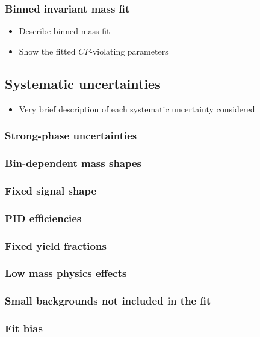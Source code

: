 \documentclass[12pt, a4paper, notitlepage, onecolumn]{article}
\begin{document}
\subsubsection{Binned invariant mass fit}
  \begin{itemize}[nosep]
    \setlength{\itemindent}{2.5em}
    \item[\textasteriskcentered]{Describe binned mass fit}
    \item[\textasteriskcentered]{Show the fitted $C\!P$-violating parameters}
  \end{itemize}
\subsection{Systematic uncertainties}
  \begin{itemize}[nosep]
    \setlength{\itemindent}{2em}
    \item[\textendash]{Very brief description of each systematic uncertainty considered}
  \end{itemize}
\subsubsection{Strong-phase uncertainties}
\subsubsection{Bin-dependent mass shapes}
\subsubsection{Fixed signal shape}
\subsubsection{PID efficiencies}
\subsubsection{Fixed yield fractions}
\subsubsection{Low mass physics effects}
\subsubsection{Small backgrounds not included in the fit}
\subsubsection{Fit bias}
\end{document}
